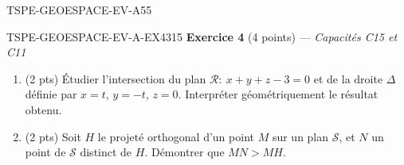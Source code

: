 \begin{evaluation}{TSPE-GEOESPACE-EV-A}{55}
\begin{exercice}{TSPE-GEOESPACE-EV-A-EX4}{3}{15}
\textbf{Exercice 4} (4 points) — \textit{Capacités C15 et C11}

\medskip

\begin{enumerate}
  \item (2 pts) Étudier l'intersection du plan $\mathcal{R}:\ x+y+z-3=0$ et de
        la droite $\Delta$ définie par $x=t$, $y=-t$, $z=0$. Interpréter
        géométriquement le résultat obtenu.
  \item (2 pts) Soit $H$ le projeté orthogonal d'un point $M$ sur un plan
        $\mathcal{S}$, et $N$ un point de $\mathcal{S}$ distinct de $H$.
        Démontrer que $MN>MH$.
\end{enumerate}
\end{exercice}

\end{evaluation}
